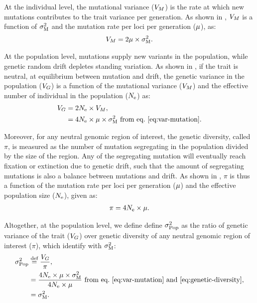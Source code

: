 \documentclass{article}
\begin{document}
At the individual level, the mutational variance ($V_{M}$) is the rate at which new mutations contributes to the trait variance per generation.
As shown in \textcite{lande_quantitative_1979, lande_sexual_1980}, $V_{M}$ is a function of $\sigma^2_{\text{M}}$ and the mutation rate per loci per generation ($\mu$), as:
\begin{gather}
    V_{M} = 2 \mu \times \sigma^2_{\text{M}} \label{eq:var-mutation}.
\end{gather}

At the population level, mutations supply new variants in the population, while genetic random drift depletes standing variation.
As shown in \textcite{lynch_mutation_1998}, if the trait is neutral, at equilibrium between mutation and drift, the genetic variance in the population ($V_{G}$) is a function of the mutational variance ($V_{M}$) and the effective number of individual in the population ($N_{\text{e}}$) as:
\begin{align}
    V_{G} & =  2 N_{\text{e}} \times V_{M}, \\
    & = 4 N_{\text{e}} \times \mu \times \sigma^2_{\text{M}} \text{ from eq.~\ref{eq:var-mutation}}\label{eq:var-genetic}.
\end{align}

Moreover, for any neutral genomic region of interest, the genetic diversity, called $\pi$, is measured as the number of mutation segregating in the population divided by the size of the region.
Any of the segregating mutation will eventually reach fixation or extinction due to genetic drift, such that the amount of segregating mutations is also a balance between mutations and drift.
As shown in \textcite{tajima_statistical_1989}, $\pi$ is thus a function of the mutation rate per loci per generation ($\mu$) and the effective population size ($N_{\text{e}}$), given as:
\begin{gather}
    \pi = 4 N_{\text{e}} \times \mu \label{eq:genetic-diversity}.
\end{gather}

Altogether, at the population level, we define define $\sigma^2_{\text{Pop}}$ as the ratio of genetic variance of the trait ($V_{G}$) over genetic diversity of any neutral genomic region of interest ($\pi$), which identify with $\sigma^2_{\text{M}}$:
\begin{align}
    \sigma^2_{\text{Pop}} & \stackrel{\text{def}}{=} \frac{V_{G} }{\pi}, \\
    & = \frac{4 N_{\text{e}} \times \mu \times \sigma^2_{\text{M}}}{4 N_{\text{e}} \times \mu} \text{ from eq.~\ref{eq:var-mutation} and~\ref{eq:genetic-diversity}}, \\
    & = \sigma^2_{\text{M}}. \label{eq:rate-pop}
\end{align}
\end{document}
